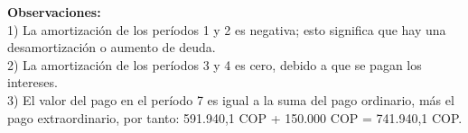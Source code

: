 	\textbf{Observaciones: }\\
	1)	La amortización de los períodos 1 y 2 es negativa; esto significa que hay una desamortización o aumento de deuda.\\
	2)	La amortización de los períodos 3 y 4 es cero, debido a que se pagan los intereses.\\
	3)	 El valor del pago en el período 7 es igual a la suma del pago ordinario, más el pago extraordinario, por tanto:  591.940,1 
 COP  +  150.000  COP  =  741.940,1  COP.\\
